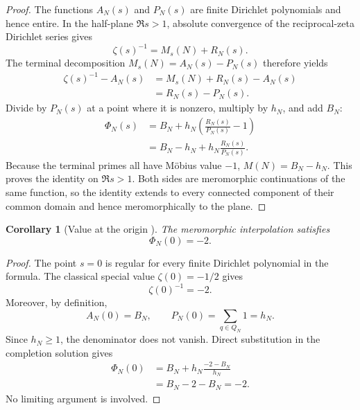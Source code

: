 \documentclass[11pt]{amsart}
\numberwithin{equation}{section}
\theoremstyle{plain}
\newtheorem{corollary}[theorem]{Corollary}
\theoremstyle{definition}
\theoremstyle{remark}
\newcommand{\1}{\mathbf{1}}
\begin{document}
\begin{proof}
The functions \(A_N(s)\) and \(P_N(s)\) are finite Dirichlet polynomials
and hence entire.  In the half-plane \(\Re s>1\), absolute convergence of
the reciprocal-zeta Dirichlet series gives
\begin{equation}
\zeta(s)^{-1}
=
M_s(N)+R_N(s).
\label{eq:canonical_proof_reciprocal_split}
\end{equation}
The terminal decomposition \(M_s(N)=A_N(s)-P_N(s)\) therefore yields
\begin{align}
\zeta(s)^{-1}-A_N(s)
&=
M_s(N)+R_N(s)-A_N(s)
\label{eq:canonical_proof_step_one}
\\
&=
R_N(s)-P_N(s).
\label{eq:canonical_proof_step_two}
\end{align}
Divide by \(P_N(s)\) at a point where it is nonzero, multiply by \(h_N\),
and add \(B_N\):
\begin{align}
\Phi_N(s)
&=
B_N+h_N\left(\frac{R_N(s)}{P_N(s)}-1\right)
\label{eq:canonical_proof_step_three}
\\
&=
B_N-h_N+h_N\frac{R_N(s)}{P_N(s)}.
\label{eq:canonical_proof_step_four}
\end{align}
Because the terminal primes all have Möbius value \(-1\),
\(M(N)=B_N-h_N\).  This proves the identity on \(\Re s>1\).  Both sides
are meromorphic continuations of the same function, so the identity extends
to every connected component of their common domain and hence
meromorphically to the plane.
\end{proof}


\begin{corollary}[Value at the origin {}]
\label{cor:Phi_origin}
The meromorphic interpolation satisfies
\begin{equation}
\boxed{\Phi_N(0)=-2.}
\label{eq:Phi_origin}
\end{equation}
\end{corollary}

\begin{proof}
The point \(s=0\) is regular for every finite Dirichlet polynomial in the
formula.  The classical special value \(\zeta(0)=-1/2\) gives
\begin{equation}
\zeta(0)^{-1}=-2.
\label{eq:origin_inverse_zeta}
\end{equation}
Moreover, by definition,
\begin{equation}
A_N(0)=B_N,
\qquad
P_N(0)=\sum_{q\in Q_N}1=h_N.
\label{eq:origin_finite_values}
\end{equation}
Since \(h_N\geq1\), the denominator does not vanish.  Direct substitution
in the completion solution gives
\begin{align}
\Phi_N(0)
&=
B_N+h_N\frac{-2-B_N}{h_N}
\label{eq:origin_substitution_detailed}
\\
&=
B_N-2-B_N
=-2.
\label{eq:origin_cancellation_detailed}
\end{align}
No limiting argument is involved.
\end{proof}
\end{document}
